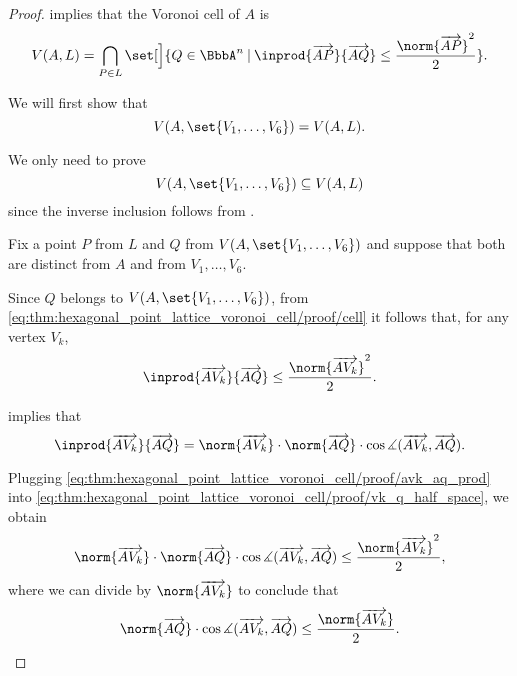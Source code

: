 \begin{proof}
   implies that the Voronoi cell of \( A \) is
  \begin{equation}\label{eq:thm:hexagonal_point_lattice_voronoi_cell/proof/cell}
    V(A, L) = \bigcap_{P \in L} \set[\Big]{ Q \in \BbbA^n \given \inprod {\vect{AP}} {\vect{AQ}} \leq \frac {\norm{\vect{AP}}^2} 2 }.
  \end{equation}

   We will first show that
  \begin{equation*}
    V(A, \set{ V_1, \ldots, V_6 }) = V(A, L).
  \end{equation*}

  We only need to prove
  \begin{equation*}
    V(A, \set{ V_1, \ldots, V_6 }) \subseteq V(A, L)
  \end{equation*}
  since the inverse inclusion follows from .

  Fix a point \( P \) from \( L \) and \( Q \) from \( V(A, \set{ V_1, \ldots, V_6 }) \) and suppose that both are distinct from \( A \) and from \( V_1, \ldots, V_6 \).

  Since \( Q \) belongs to \( V(A, \set{ V_1, \ldots, V_6 }) \), from \eqref{eq:thm:hexagonal_point_lattice_voronoi_cell/proof/cell} it follows that, for any vertex \( V_k \),
  \begin{equation}\label{eq:thm:hexagonal_point_lattice_voronoi_cell/proof/vk_q_half_space}
    \inprod {\vect{AV_k}} {\vect{AQ}} \leq \frac {\norm{\vect{AV_k}}^2} 2.
  \end{equation}

   implies that
  \begin{equation}\label{eq:thm:hexagonal_point_lattice_voronoi_cell/proof/avk_aq_prod}
    \inprod {\vect{AV_k}} {\vect{AQ}}
    =
    \norm{\vect{AV_k}} \cdot \norm{\vect{AQ}} \cdot \cos\measuredangle(\vect{AV_k}, \vect{AQ}).
  \end{equation}

  Plugging \eqref{eq:thm:hexagonal_point_lattice_voronoi_cell/proof/avk_aq_prod} into \eqref{eq:thm:hexagonal_point_lattice_voronoi_cell/proof/vk_q_half_space}, we obtain
  \begin{equation*}
    \norm{\vect{AV_k}} \cdot \norm{\vect{AQ}} \cdot \cos\measuredangle(\vect{AV_k}, \vect{AQ}) \leq \frac {\norm{\vect{AV_k}}^2} 2,
  \end{equation*}
  where we can divide by \( \norm{\vect{AV_k}} \) to conclude that
  \begin{equation}\label{eq:thm:hexagonal_point_lattice_voronoi_cell/proof/aq_cos_avk_ineq}
    \norm{\vect{AQ}} \cdot \cos\measuredangle(\vect{AV_k}, \vect{AQ}) \leq \frac {\norm{\vect{AV_k}}} 2.
  \end{equation}


\end{proof}

